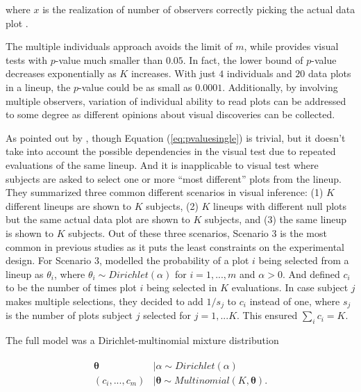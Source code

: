 \documentclass[]{interact}
\theoremstyle{plain}%
\theoremstyle{definition}
\theoremstyle{remark}
\begin{document}
where \(x\) is the realization of number of observers correctly picking
the actual data plot \citep{majumder_validation_2013}.

The multiple individuals approach avoids the limit of \(m\), while
provides visual tests with \(p\)-value much smaller than \(0.05\). In
fact, the lower bound of \(p\)-value decreases exponentially as \(K\)
increases. With just \(4\) individuals and \(20\) data plots in a
lineup, the \(p\)-value could be as small as \(0.0001\). Additionally,
by involving multiple observers, variation of individual ability to read
plots can be addressed to some degree as different opinions about visual
discoveries can be collected.

As pointed out by \citet{vanderplas2021statistical}, though Equation
(\ref{eq:pvaluesingle}) is trivial, but it doesn't take into account the
possible dependencies in the visual test due to repeated evaluations of
the same lineup. And it is inapplicable to visual test where subjects
are asked to select one or more ``most different'' plots from the
lineup. They summarized three common different scenarios in visual
inference: (1) \(K\) different lineups are shown to \(K\) subjects, (2)
\(K\) lineups with different null plots but the same actual data plot
are shown to \(K\) subjects, and (3) the same lineup is shown to \(K\)
subjects. Out of these three scenarios, Scenario 3 is the most common in
previous studies as it puts the least constraints on the experimental
design. For Scenario 3, \citet{vanderplas2021statistical} modelled the
probability of a plot \(i\) being selected from a lineup as
\(\theta_i\), where \(\theta_i \sim Dirichlet(\alpha)\) for
\(i=1,...,m\) and \(\alpha > 0\). And defined \(c_i\) to be the number
of times plot \(i\) being selected in \(K\) evaluations. In case subject
\(j\) makes multiple selections, they decided to add \(1/s_j\) to
\(c_i\) instead of one, where \(s_j\) is the number of plots subject
\(j\) selected for \(j=1,...K\). This ensured \(\sum_{i}c_i=K\).

The full model was a Dirichlet-multinomial mixture distribution

\begin{align} \label{eq:dirichlet-multinomial}\begin{split}
\boldsymbol{\theta}&|\alpha \sim Dirichlet(\alpha)\\
(c_i,...,c_m)&|\boldsymbol{\theta} \sim Multinomial(K, \boldsymbol{\theta}).
\end{split}\end{align}
\end{document}
